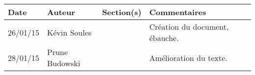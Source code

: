 \small
\begin{tabular}{|p{1.5cm}|l|p{2.5cm}|p{7.8cm}|l|}
  \hline
 
   \rowcolor{Gainsboro}Date  & Auteur & Section(s) & Commentaires \\
  \hline
26/01/15 & Kévin Soules &  & Création du document, ébauche.\\
  \hline
28/01/15 & Prune Budowski & & Amélioration du texte.
\\
  \hline
\end{tabular}
\normalsize
